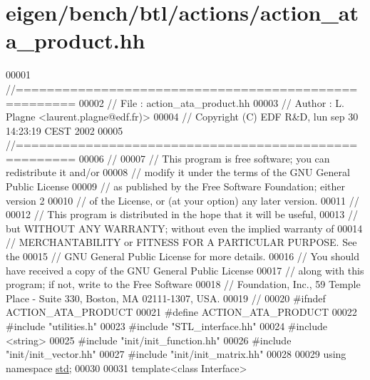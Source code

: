 \hypertarget{eigen_2bench_2btl_2actions_2action__ata__product_8hh_source}{}\section{eigen/bench/btl/actions/action\+\_\+ata\+\_\+product.hh}
\label{eigen_2bench_2btl_2actions_2action__ata__product_8hh_source}

\begin{DoxyCode}
00001 \textcolor{comment}{//=====================================================}
00002 \textcolor{comment}{// File   :  action\_ata\_product.hh}
00003 \textcolor{comment}{// Author :  L. Plagne <laurent.plagne@edf.fr)>}
00004 \textcolor{comment}{// Copyright (C) EDF R&D,  lun sep 30 14:23:19 CEST 2002}
00005 \textcolor{comment}{//=====================================================}
00006 \textcolor{comment}{//}
00007 \textcolor{comment}{// This program is free software; you can redistribute it and/or}
00008 \textcolor{comment}{// modify it under the terms of the GNU General Public License}
00009 \textcolor{comment}{// as published by the Free Software Foundation; either version 2}
00010 \textcolor{comment}{// of the License, or (at your option) any later version.}
00011 \textcolor{comment}{//}
00012 \textcolor{comment}{// This program is distributed in the hope that it will be useful,}
00013 \textcolor{comment}{// but WITHOUT ANY WARRANTY; without even the implied warranty of}
00014 \textcolor{comment}{// MERCHANTABILITY or FITNESS FOR A PARTICULAR PURPOSE.  See the}
00015 \textcolor{comment}{// GNU General Public License for more details.}
00016 \textcolor{comment}{// You should have received a copy of the GNU General Public License}
00017 \textcolor{comment}{// along with this program; if not, write to the Free Software}
00018 \textcolor{comment}{// Foundation, Inc., 59 Temple Place - Suite 330, Boston, MA  02111-1307, USA.}
00019 \textcolor{comment}{//}
00020 \textcolor{preprocessor}{#ifndef ACTION\_ATA\_PRODUCT}
00021 \textcolor{preprocessor}{#define ACTION\_ATA\_PRODUCT}
00022 \textcolor{preprocessor}{#include "utilities.h"}
00023 \textcolor{preprocessor}{#include "STL\_interface.hh"}
00024 \textcolor{preprocessor}{#include <string>}
00025 \textcolor{preprocessor}{#include "init/init\_function.hh"}
00026 \textcolor{preprocessor}{#include "init/init\_vector.hh"}
00027 \textcolor{preprocessor}{#include "init/init\_matrix.hh"}
00028 
00029 \textcolor{keyword}{using namespace }\hyperlink{namespacestd}{std};
00030 
00031 \textcolor{keyword}{template}<\textcolor{keyword}{class} Interface>

\end{DoxyCode}
